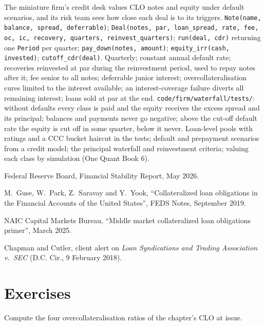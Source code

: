 \begin{build}
 The miniature firm's credit desk values CLO notes and equity under
default scenarios, and its risk team sees how close each deal is to its triggers.
 \texttt{Note(name, balance, spread, deferrable)};
\texttt{Deal(notes, par, loan\_spread, rate, fee, oc, ic, recovery, quarters,
reinvest\_quarters)}; \texttt{run(deal, cdr)} returning one \texttt{Period} per
quarter; \texttt{pay\_down(notes, amount)}; \texttt{equity\_irr(cash, invested)};
\texttt{cutoff\_cdr(deal)}.
 Quarterly; constant annual default rate; recoveries reinvested at par
during the reinvestment period, used to repay notes after it; fee senior to all notes;
deferrable junior interest; overcollateralisation cures limited to the interest
available; an interest-coverage failure diverts all remaining interest; loans sold at
par at the end.
 \texttt{code/firm/waterfall/tests/}: without defaults every
class is paid and the equity receives the excess spread and its principal; balances
and payments never go negative; above the cut-off default rate the equity is cut off in
some quarter, below it never.
 Loan-level pools with ratings and a CCC bucket haircut in the tests;
default and prepayment scenarios from a credit model; the principal waterfall and
reinvestment criteria; valuing each class by simulation (One Quant Book 6).
\end{build}

\begin{omsources}
\item Federal Reserve Board, Financial Stability Report, May 2026.
\item M.~Guse, W.~Park, Z.~Saravay and Y.~Yook, ``Collateralized loan obligations in the
Financial Accounts of the United States'', FEDS Notes, September 2019.
\item NAIC Capital Markets Bureau, ``Middle market collateralized loan obligations
primer'', March 2025.
\item Chapman and Cutler, client alert on \emph{Loan Syndications and Trading
Association v.\ SEC} (D.C. Cir., 9 February 2018).
\end{omsources}

\section{Exercises}

\begin{exercise}[$\star$]\label{exo:m2:loans-clos-and-securitisation:1}
Compute the four overcollateralisation ratios of the chapter's CLO at issue.
\end{exercise}

